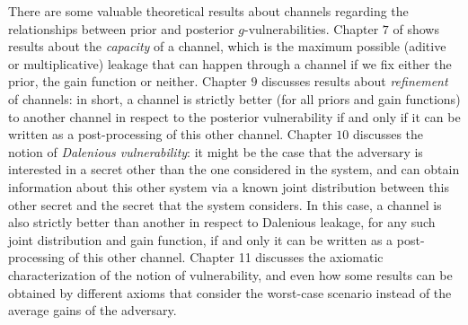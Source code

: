 There are some valuable theoretical results about channels regarding the relationships between prior and posterior $g$-vulnerabilities. Chapter $7$ of \cite{QIF} shows results about the \emph{capacity} of a channel, which is the maximum possible (aditive or multiplicative) leakage that can happen through a channel if we fix either the prior, the gain function or neither. Chapter $9$ discusses results about \emph{refinement} of channels: in short, a channel is strictly better (for all priors and gain functions) to another channel in respect to the posterior vulnerability if and only if it can be written as a post-processing of this other channel. Chapter $10$ discusses the notion of \emph{Dalenious vulnerability}: it might be the case that the adversary is interested in a secret other than the one considered in the system, and can obtain information about this other system via a known joint distribution between this other secret and the secret that the system considers. In this case, a channel is also strictly better than another in respect to Dalenious leakage, for any such joint distribution and gain function, if and only it can be written as a post-processing of this other channel. Chapter 11 \cite{QIF} discusses the axiomatic characterization of the notion of vulnerability, and even how some results can be obtained by different axioms that consider the worst-case scenario instead of the average gains of the adversary.


